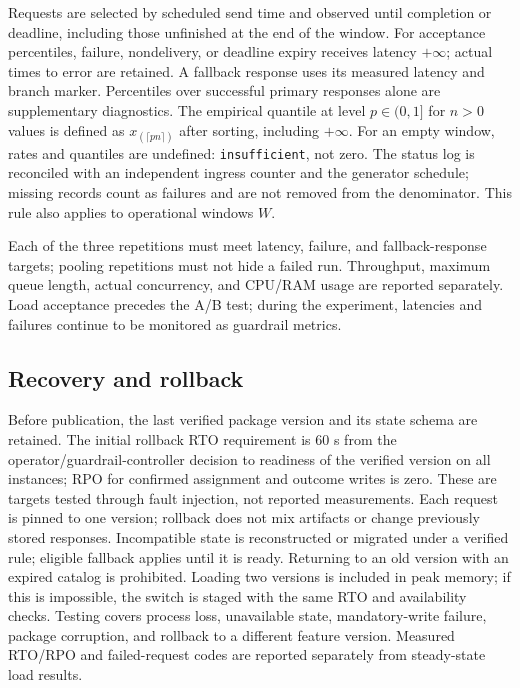 \documentclass[12pt,a4paper]{article}
\newcommand{\code}[1]{{\ttfamily\small\nolinkurl{#1}}}
\theoremstyle{plainru}
\begin{document}
Requests are selected by scheduled send time and observed
until completion or deadline, including those unfinished at the end of the window.
For acceptance percentiles, failure, nondelivery, or deadline expiry
receives latency $+\infty$; actual times to error are retained.
A fallback response uses its measured latency and branch marker.
Percentiles over successful primary responses alone are supplementary diagnostics.
The empirical quantile at level $p\in(0,1]$ for $n>0$ values
is defined as $x_{(\lceil pn\rceil)}$ after sorting, including $+\infty$.
For an empty window, rates and quantiles are undefined: \code{insufficient},
not zero. The status log is reconciled with an independent ingress counter and
the generator schedule; missing records count as failures and are not removed
from the denominator. This rule also applies to operational windows $W$.

Each of the three repetitions must meet latency,
failure, and fallback-response targets; pooling repetitions must not hide
a failed run. Throughput,
maximum queue length, actual concurrency, and CPU/RAM usage are reported separately.
Load acceptance precedes the A/B test; during the experiment,
latencies and failures continue to be monitored as guardrail metrics.

\subsection{Recovery and rollback}\label{sec:ops-recovery}

Before publication, the last verified package version
and its state schema are retained. The initial rollback RTO requirement is 60 s
from the operator/guardrail-controller decision to readiness of the verified
version on all instances; RPO for confirmed assignment
and outcome writes is zero. These are targets tested through fault injection,
not reported measurements. Each request is pinned to one version;
rollback does not mix artifacts or change previously stored responses.
Incompatible state is reconstructed or migrated under a
verified rule; eligible fallback applies until it is ready.
Returning to an old version with an expired catalog is prohibited.
Loading two versions is included in peak memory; if this is impossible,
the switch is staged with the same RTO and availability checks.
Testing covers process loss, unavailable state,
mandatory-write failure, package corruption, and rollback to a different
feature version. Measured RTO/RPO and failed-request codes
are reported separately from steady-state load results.
\end{document}
